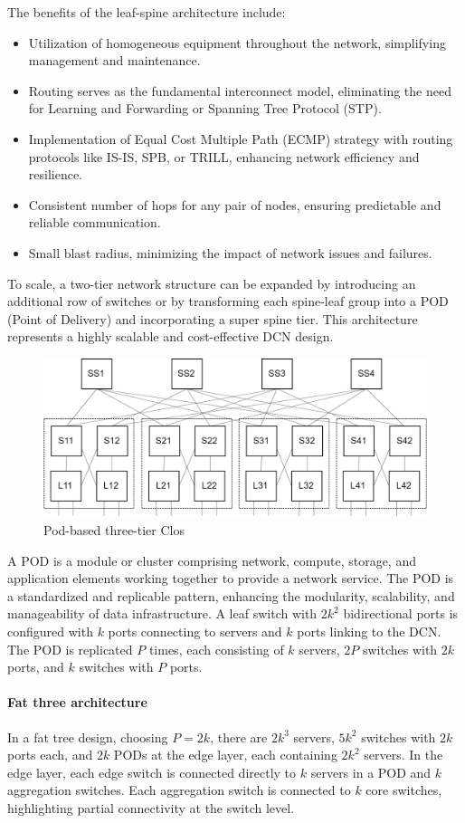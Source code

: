 The benefits of the leaf-spine architecture include:
\begin{itemize}
    \item Utilization of homogeneous equipment throughout the network, simplifying management and maintenance.
    \item Routing serves as the fundamental interconnect model, eliminating the need for Learning and Forwarding or Spanning Tree Protocol (STP).
    \item Implementation of Equal Cost Multiple Path (ECMP) strategy with routing protocols like IS-IS, SPB, or TRILL, enhancing network efficiency and resilience.
    \item Consistent number of hops for any pair of nodes, ensuring predictable and reliable communication.
    \item Small blast radius, minimizing the impact of network issues and failures.
\end{itemize}
To scale, a two-tier network structure can be expanded by introducing an additional row of switches or by transforming each spine-leaf group into a POD (Point of Delivery) and incorporating a super spine tier. 
This architecture represents a highly scalable and cost-effective DCN design.
\begin{figure}[H]
    \centering
    \includegraphics[width=0.6\linewidth]{images/pod.png}
    \caption{Pod-based three-tier Clos}
\end{figure}

A POD is a module or cluster comprising network, compute, storage, and application elements working together to provide a network service. 
The POD is a standardized and replicable pattern, enhancing the modularity, scalability, and manageability of data infrastructure.
A leaf switch with $2k^2$ bidirectional ports is configured with $k$ ports connecting to servers and $k$ ports linking to the DCN.
The POD is replicated $P$ times, each consisting of $k$ servers, $2P$ switches with $2k$ ports, and $k$ switches with $P$ ports.

\paragraph*{Fat three architecture}
In a fat tree design, choosing $P=2k$, there are $2k^3$ servers, $5k^2$ switches with $2k$ ports each, and $2k$ PODs at the edge layer, each containing $2k^2$ servers.
In the edge layer, each edge switch is connected directly to $k$ servers in a POD and $k$ aggregation switches.
Each aggregation switch is connected to $k$ core switches, highlighting partial connectivity at the switch level.

